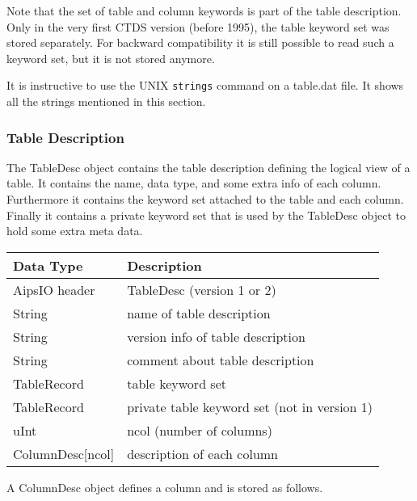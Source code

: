 Note that the set of table and column keywords is part of the table
description.
Only in the very first CTDS version (before 1995), the table
keyword set was stored separately. For backward compatibility it is
still possible to read such a keyword set, but it is not stored
anymore.

It is instructive to use the UNIX \texttt{strings} command on a
table.dat file. It shows all the strings mentioned in this section.


\subsubsection{\label{CTDS:TABLEDESC}Table Description}
The TableDesc object contains the table description defining 
the logical view of a table. It contains
the name, data type, and some extra info of each column. Furthermore
it contains the keyword set attached to the table and each column.
Finally it contains a private keyword set that is used by the
TableDesc object to hold some extra meta data.

\vspace{0.15in}
\begin{tabular}{|l|p{13cm}|} \hline
  Data Type & Description \\ \hline\hline
  AipsIO header & TableDesc (version 1 or 2) \\
  String & name of table description \\
  String & version info of table description \\
  String & comment about table description\\
  TableRecord & table keyword set \\
  TableRecord & private table keyword set (not in version 1) \\
  uInt & ncol (number of columns) \\
  ColumnDesc[ncol] & description of each column \\
  \hline
\end{tabular}
\vspace{0.15in}

A ColumnDesc object defines a column and is stored as follows.

